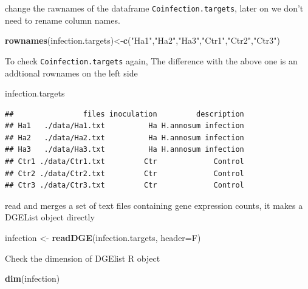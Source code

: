 \documentclass[
]{article}
\newenvironment{Shaded}{\begin{snugshade}}{\end{snugshade}}
\newcommand{\AttributeTok}[1]{\textcolor[rgb]{0.13,0.29,0.53}{#1}}
\newcommand{\FunctionTok}[1]{\textcolor[rgb]{0.13,0.29,0.53}{\textbf{#1}}}
\newcommand{\NormalTok}[1]{#1}
\newcommand{\OtherTok}[1]{\textcolor[rgb]{0.56,0.35,0.01}{#1}}
\newcommand{\StringTok}[1]{\textcolor[rgb]{0.31,0.60,0.02}{#1}}
\begin{document}
change the rawnames of the dataframe \texttt{Coinfection.targets}, later
on we don't need to rename column names.

\begin{Shaded}
\begin{Highlighting}[]
\FunctionTok{rownames}\NormalTok{(infection.targets)}\OtherTok{\textless{}{-}}\FunctionTok{c}\NormalTok{(}\StringTok{"Ha1"}\NormalTok{,}\StringTok{"Ha2"}\NormalTok{,}\StringTok{"Ha3"}\NormalTok{,}\StringTok{"Ctr1"}\NormalTok{,}\StringTok{"Ctr2"}\NormalTok{,}\StringTok{"Ctr3"}\NormalTok{)}
\end{Highlighting}
\end{Shaded}

To check \texttt{Coinfection.targets} again, The difference with the
above one is an addtional rownames on the left side

\begin{Shaded}
\begin{Highlighting}[]
\NormalTok{infection.targets}
\end{Highlighting}
\end{Shaded}

\begin{verbatim}
##                files inoculation         description
## Ha1   ./data/Ha1.txt          Ha H.annosum infection
## Ha2   ./data/Ha2.txt          Ha H.annosum infection
## Ha3   ./data/Ha3.txt          Ha H.annosum infection
## Ctr1 ./data/Ctr1.txt         Ctr             Control
## Ctr2 ./data/Ctr2.txt         Ctr             Control
## Ctr3 ./data/Ctr3.txt         Ctr             Control
\end{verbatim}

read and merges a set of text files containing gene expression counts,
it makes a DGEList object directly

\begin{Shaded}
\begin{Highlighting}[]
\NormalTok{infection }\OtherTok{\textless{}{-}} \FunctionTok{readDGE}\NormalTok{(infection.targets, }\AttributeTok{header=}\NormalTok{F)}
\end{Highlighting}
\end{Shaded}

Check the dimension of DGElist R object

\begin{Shaded}
\begin{Highlighting}[]
\FunctionTok{dim}\NormalTok{(infection)}
\end{Highlighting}
\end{Shaded}
\end{document}
